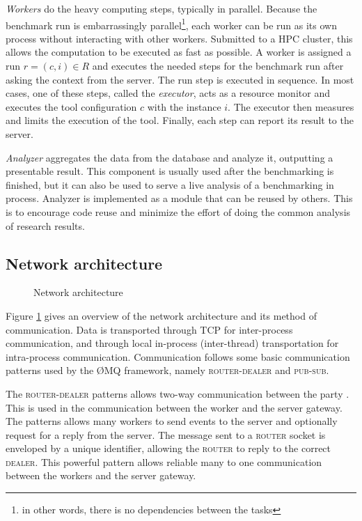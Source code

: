 \emph{Workers} do the heavy computing steps, typically in parallel.
Because the benchmark run is embarrassingly parallel\footnote{in other words, there is no dependencies between the tasks}, each worker can be run as its own process without interacting with other workers.
Submitted to a HPC cluster, this allows the computation to be executed as fast as possible.
A worker is assigned a run $r = (c, i) \in R$ and executes the needed steps for the benchmark run after asking the context from the server.
The run step is executed in sequence.
In most cases, one of these steps, called the \emph{executor}, acts as a resource monitor and executes the tool configuration $c$ with the instance $i$.
The executor then measures and limits the execution of the tool.
Finally, each step can report its result to the server.

\emph{Analyzer} aggregates the data from the database and analyze it, outputting a presentable result.
This component is usually used after the benchmarking is finished, but it can also be used to serve a live analysis of a benchmarking in process.
Analyzer is implemented as a module that can be reused by others.
This is to encourage code reuse and minimize the effort of doing the common analysis of research results.


\subsection{Network architecture}

\begin{figure}
    
    \caption{Network architecture}
    \label{fig:zmq}
\end{figure}

Figure \ref{fig:zmq} gives an overview of the network architecture and its method of communication.
Data is transported through TCP for inter-process communication, and through local in-process (inter-thread) transportation for intra-process communication.
Communication follows some basic communication patterns used by the \O{}MQ framework, namely \textsc{router-dealer} and \textsc{pub-sub}.

The \textsc{router-dealer} patterns allows two-way communication between the party \citep{hintjens2013zeromq}.
This is used in the communication between the worker and the server gateway.
The patterns allows many workers to send events to the server and optionally request for a reply from the server.
The message sent to a \textsc{router} socket is enveloped by a unique identifier, allowing the \textsc{router} to reply to the correct \textsc{dealer}.
This powerful pattern allows reliable many to one communication between the workers and the server gateway.



